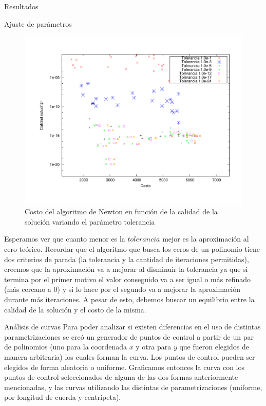 \begin{section}{Resultados}
\begin{subsection}{Ajuste de parámetros}
		\begin{figure}[H]
		  \centering
			\includegraphics[width=14cm]{graficos/tol_graf.pdf}
		  \caption{Costo del algoritmo de Newton en función de la calidad de la solución variando el parámetro tolerancia}
		  \label{fig:5p_r}
		\end{figure}
		
		\VSP
		
		Esperamos ver que cuanto menor es la $tolerancia$ mejor es la aproximación al cero teórico. Recordar que el algoritmo que busca los ceros de un polinomio tiene dos criterios de parada (la tolerancia y la cantidad de iteraciones permitidas), creemos que la aproximación va a mejorar al disminuir la tolerancia ya que si termina por el primer motivo el valor conseguido va a ser igual o más refinado (más cercano a 0) y si lo hace por el segundo va a mejorar la aproximación durante más iteraciones. A pesar de esto, debemos buscar un equilibrio entre la calidad de la solución y el costo de la misma.\\
		
	\end{subsection}

	\begin{subsection}{Análisis de curvas}
		Para poder analizar si existen diferencias en el uso de distintas parametrizaciones se creó un generador de puntos de control a partir de un par de polinomios (uno para la coordenada $x$ y otra para $y$ que fueron elegidos de manera arbitraria) los cuales forman la curva. Los puntos de control pueden ser elegidos de forma aleatoria o uniforme. Graficamos entonces la curva con los puntos de control seleccionados de alguna de las dos formas anteriormente mencionadas, y las curvas utilizando las distintas de parametrizaciones (uniforme, por longitud de cuerda y centrípeta).
		

\end{subsection}
\end{section}
